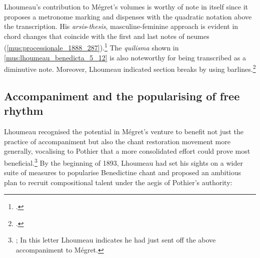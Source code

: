 Lhoumeau's contribution to Mégret's volumes is worthy of note in itself since it proposes a metronome marking and dispenses with the quadratic notation above the transcription.
His \emph{arsis}-\emph{thesis}, masculine-feminine approach is evident in chord changes that coincide with the first and last notes of neumes (\cref{mus:processionale_1888_287}).\footcite[1:287]{Processionalemonasticum1888}
The \emph{quilisma} shown in \cref{mus:lhoumeau_benedicta_5_12} is also noteworthy for being transcribed as a diminutive note.
Moreover, Lhoumeau indicated section breaks by using barlines.\footnote{\cite[4:12]{Melodieschantgregorien1892}.}

\subsection{Accompaniment and the popularising of free rhythm}
Lhoumeau recognised the potential in Mégret's venture to benefit not just the practice of accompaniment but also the chant restoration movement more generally, vocalising to Pothier that a more consolidated effort could prove most beneficial.\footnote{; In this letter Lhoumeau indicates he had just sent off the above accompaniment to Mégret.}
By the beginning of 1893, Lhoumeau had set his sights on a wider suite of measures to popularise Benedictine chant and proposed an ambitious plan to recruit compositional talent under the aegis of Pothier's authority:

